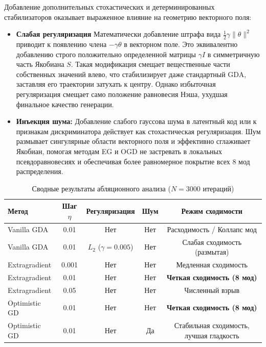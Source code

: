 \documentclass[12pt,a4paper]{article}
\begin{document}
	Добавление дополнительных стохастических и детерминированных стабилизаторов оказывает выраженное влияние на геометрию векторного поля:
	\begin{itemize}
		\item \textbf{Слабая регуляризация } Математически добавление штрафа вида $\frac{1}{2}\gamma \|\theta\|^2$ приводит к появлению члена $-\gamma \theta$ в векторном поле. Это эквивалентно добавлению строго положительно определенной матрицы $\gamma I$ в симметричную часть Якобиана $S$. Такая модификация смещает вещественные части собственных значений влево, что стабилизирует даже стандартный GDA, заставляя его траектории затухать к центру. Однако избыточная регуляризация смещает само положение равновесия Нэша, ухудшая финальное качество генерации.
		\item \textbf{Инъекция шума:} Добавление слабого гауссова шума в латентный код или к признакам дискриминатора действует как стохастическая регуляризация. Шум размывает сингулярные области векторного поля и эффективно сглаживает Якобиан, помогая методам EG и OGD не застревать в локальных псевдоравновесиях и обеспечивая более равномерное покрытие всех 8 мод распределения.
	\end{itemize}
	
	\begin{table}[h!]
		\centering
		\caption{Сводные результаты абляционного анализа ($N = 3000$ итераций)}
		\label{tab:ablation}
		\begin{tabular}{lcccc}
			\hline
			\textbf{Метод} & \textbf{Шаг $\eta$} & \textbf{Регуляризация} & \textbf{Шум} & \textbf{Режим сходимости} \\ \hline
			Vanilla GDA   & 0.01   & Нет                    & Нет          & Расходимость / Коллапс мод \\ 
			Vanilla GDA   & 0.01   & $L_2$ ($\gamma=0.005$) & Нет          & Слабая сходимость (размытая) \\ \hline
			Extragradient & 0.001  & Нет                    & Нет          & Медленная сходимость \\ 
			Extragradient & 0.01   & Нет                    & Нет          & \textbf{Четкая сходимость (8 мод)} \\ 
			Extragradient & 0.05   & Нет                    & Нет          & Численный взрыв \\ \hline
			Optimistic GD & 0.01   & Нет                    & Нет          & \textbf{Четкая сходимость (8 мод)} \\ 
			Optimistic GD & 0.01   & Нет                    & Да           & Стабильная сходимость, лучшая гладкость \\ \hline
		\end{tabular}
	\end{table}
	
\end{document}
